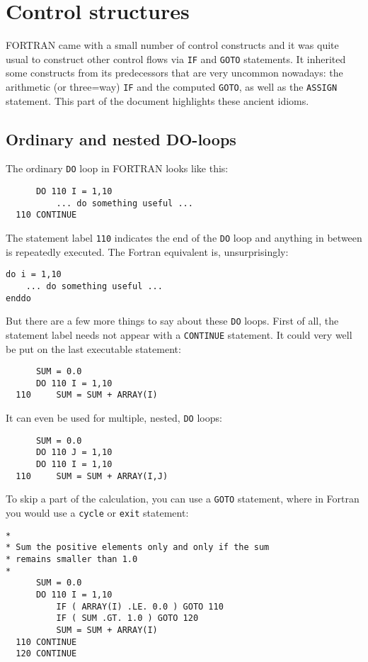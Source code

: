 \section{Control structures}
FORTRAN came with a small number of control constructs and it was quite usual to construct
other control flows via \verb+IF+ and \verb+GOTO+ statements. It inherited some constructs
from its predecessors that are very uncommon nowadays: the arithmetic (or three=way) \verb+IF+ and the
computed \verb+GOTO+, as well as the \verb+ASSIGN+ statement. This part of the document
highlights these ancient idioms.

\subsection{Ordinary and nested DO-loops}
The ordinary \verb+DO+ loop in FORTRAN looks like this:
%
\begin{verbatim}
      DO 110 I = 1,10
          ... do something useful ...
  110 CONTINUE
\end{verbatim}
%
The statement label \verb+110+ indicates the end of the \verb+DO+ loop and anything in between
is repeatedly executed. The Fortran equivalent is, unsurprisingly:
%
\begin{verbatim}
do i = 1,10
    ... do something useful ...
enddo
\end{verbatim}
%
But there are a few more things to say about these \verb+DO+ loops. First of all, the
statement label needs not appear with a \verb+CONTINUE+ statement. It could very well be
put on the last executable statement:
%
\begin{verbatim}
      SUM = 0.0
      DO 110 I = 1,10
  110     SUM = SUM + ARRAY(I)
\end{verbatim}
%
It can even be used for multiple, nested, \verb+DO+ loops:
%
\begin{verbatim}
      SUM = 0.0
      DO 110 J = 1,10
      DO 110 I = 1,10
  110     SUM = SUM + ARRAY(I,J)
\end{verbatim}
%
To skip a part of the calculation, you can use a \verb+GOTO+ statement, where in Fortran
you would use a \verb+cycle+ or \verb+exit+ statement:
%
\begin{verbatim}
*
* Sum the positive elements only and only if the sum
* remains smaller than 1.0
*
      SUM = 0.0
      DO 110 I = 1,10
          IF ( ARRAY(I) .LE. 0.0 ) GOTO 110
          IF ( SUM .GT. 1.0 ) GOTO 120
          SUM = SUM + ARRAY(I)
  110 CONTINUE
  120 CONTINUE
\end{verbatim}
